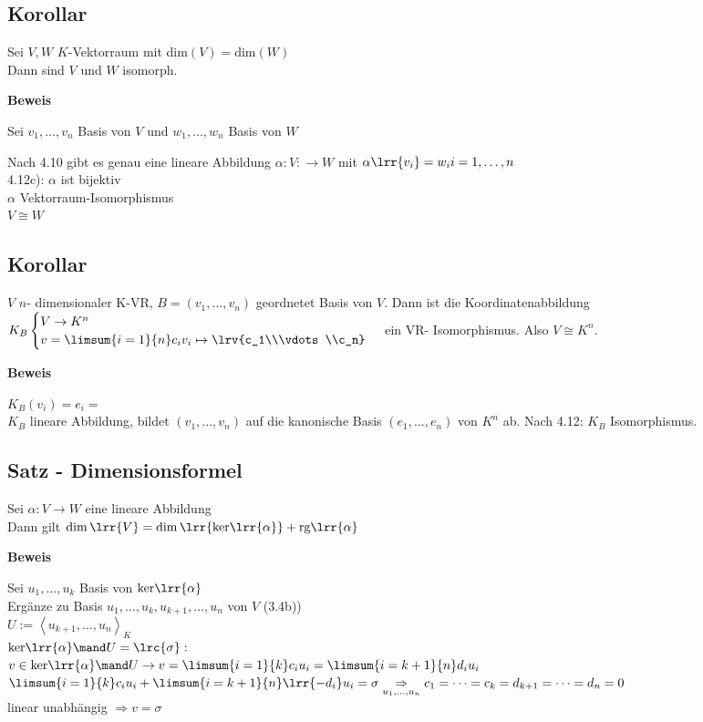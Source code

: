 \subsection{Korollar}
	Sei $V,W$ $K$-Vektorraum mit dim$(V)=$dim$(W)$\\
	Dann sind $V$ und $W$ isomorph.
	
	\textbf{Beweis}
	
	Sei $v_1,\dots,v_n$ Basis von $V$ und $w_1,\dots,w_n$ Basis von $W$
	
	Nach 4.10 gibt es genau eine lineare Abbildung $\alpha:V:\rightarrow W$ mit $\alpha\lrr{v_i}=w_i i=1,\dots,n$\\
	4.12c): $\alpha$ ist bijektiv\\
	$\alpha$ Vektorraum-Isomorphismus\\
	$V\cong W$

\subsection{Korollar}
  $V$ $n$- dimensionaler K-VR, $B=(v_1,...,v_n)$ geordnetet Basis von $V$. Dann
ist die Koordinatenabbildung $K_B\begin{cases}V\rightarrow
K^n\\v=\limsum{i=1}{n}c_iv_i\mapsto\lrv{c_1\\\vdots\\c_n}\end{cases}$ ein VR-
Isomorphismus. Also $V\cong K^n$.

  \textbf{Beweis}
  
  $K_B(v_i)=e_i=$\\
  $K_B$ lineare Abbildung, bildet $(v_1,...,v_n)$ auf die kanonische Basis
  $(e_1,...,e_n)$ von $K^n$ ab. Nach 4.12: $K_B$ Isomorphismus.

\subsection{Satz - Dimensionsformel}
	Sei $\alpha:V\rightarrow W$ eine lineare Abbildung\\
	Dann gilt $\dim\lrr{V}=\dim\lrr{\mbox{ker}\lrr{\alpha}}+\mbox{rg}\lrr{\alpha}$
	
	\textbf{Beweis}
	
	Sei $u_1,\dots,u_k$ Basis von $\mbox{ker}\lrr{\alpha}$\\
	Ergänze zu Basis $u_1,\dots,u_k,u_{k+1},\dots,u_n$ von $V$ (3.4b))\\
	$U:=\left\langle u_{k+1},\dots,u_n\right\rangle_K$\\
	$\mbox{ker}\lrr{\alpha}\mand U=\lrc{\sigma}:$\\
	$v\in\mbox{ker}\lrr{\alpha}\mand U\rightarrow v=\limsum{i=1}{k}c_iu_i=\limsum{i=k+1}{n}d_iu_i$\\
	$\limsum{i=1}{k}c_iu_i+\limsum{i=k+1}{n}\lrr{-d_i}u_i=\sigma\underset{\scriptstyle u_1,\dots,u_n}{\Rightarrow} c_1=\dots=c_k=d_{k+1}=\dots=d_n=0$\\
	linear unabhängig $\Rightarrow v=\sigma$
	
